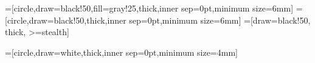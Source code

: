 %
%
%

=[circle,draw=black!50,fill=gray!25,thick,inner sep=0pt,minimum size=6mm]
=[circle,draw=black!50,thick,inner sep=0pt,minimum size=6mm]
=[draw=black!50, thick, >=stealth]

=[circle,draw=white,thick,inner sep=0pt,minimum size=4mm]


